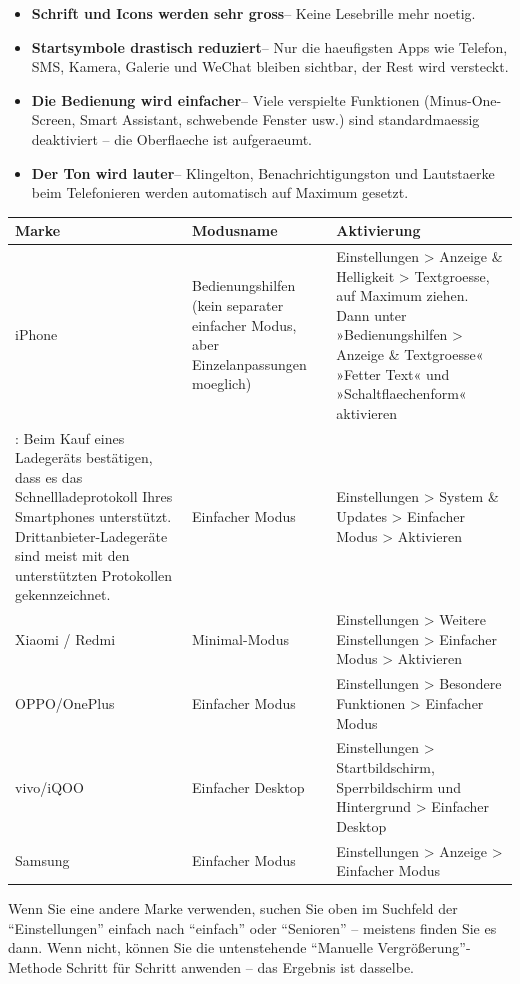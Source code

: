 \begin{itemize}
  \item \textbf{Schrift und Icons werden sehr gross}– Keine Lesebrille mehr noetig.
  \item \textbf{Startsymbole drastisch reduziert}– Nur die haeufigsten Apps wie Telefon, SMS, Kamera, Galerie und WeChat bleiben sichtbar, der Rest wird versteckt.
  \item \textbf{Die Bedienung wird einfacher}– Viele verspielte Funktionen (Minus-One-Screen, Smart Assistant, schwebende Fenster usw.) sind standardmaessig deaktiviert – die Oberflaeche ist aufgeraeumt.
  \item \textbf{Der Ton wird lauter}– Klingelton, Benachrichtigungston und Lautstaerke beim Telefonieren werden automatisch auf Maximum gesetzt.
\end{itemize}


\begin{center}
\begin{tabularx}{\linewidth}{|X|X|X|}
\hline
\textbf{Marke} & \textbf{Modusname} & \textbf{Aktivierung} \tabularnewline
\hline
iPhone & Bedienungshilfen (kein separater einfacher Modus, aber Einzelanpassungen moeglich) & Einstellungen > Anzeige \& Helligkeit > Textgroesse, auf Maximum ziehen. Dann unter »Bedienungshilfen > Anzeige \& Textgroesse« »Fetter Text« und »Schaltflaechenform« aktivieren \tabularnewline
: Beim Kauf eines Ladegeräts bestätigen, dass es das Schnellladeprotokoll Ihres Smartphones unterstützt. Drittanbieter-Ladegeräte sind meist mit den unterstützten Protokollen gekennzeichnet. & Einfacher Modus & Einstellungen > System \& Updates > Einfacher Modus > Aktivieren \tabularnewline
Xiaomi / Redmi & Minimal-Modus & Einstellungen > Weitere Einstellungen > Einfacher Modus > Aktivieren \tabularnewline
OPPO/OnePlus & Einfacher Modus & Einstellungen > Besondere Funktionen > Einfacher Modus \tabularnewline
vivo/iQOO & Einfacher Desktop & Einstellungen > Startbildschirm, Sperrbildschirm und Hintergrund > Einfacher Desktop \tabularnewline
Samsung & Einfacher Modus & Einstellungen > Anzeige > Einfacher Modus \tabularnewline
\hline
\end{tabularx}
\end{center}

Wenn Sie eine andere Marke verwenden, suchen Sie oben im Suchfeld der “Einstellungen” einfach nach “einfach” oder “Senioren” – meistens finden Sie es dann. Wenn nicht, können Sie die untenstehende “Manuelle Vergrößerung”-Methode Schritt für Schritt anwenden – das Ergebnis ist dasselbe.

